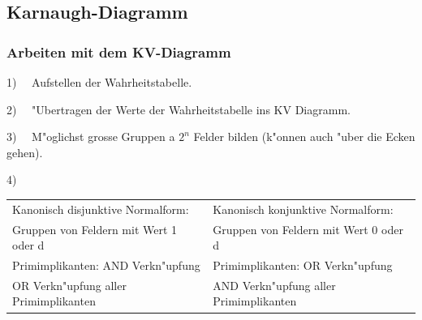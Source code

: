 \subsection{Karnaugh-Diagramm}
	\subsubsection{Arbeiten mit dem KV-Diagramm}
\begin{compactitem}
	\item 1) \ \ Aufstellen der Wahrheitstabelle.\\
	\item 2) \ \ "Ubertragen der Werte der Wahrheitstabelle ins KV Diagramm.\\
	\item 3) \ \ M"oglichst grosse Gruppen a $2^n$ Felder bilden (k"onnen auch "uber die Ecken gehen).\\
	\item 4)
	\begin{tabular}{ll}
		Kanonisch disjunktive Normalform: & Kanonisch konjunktive Normalform: \\
		Gruppen von Feldern mit Wert 1 oder d & Gruppen von Feldern mit Wert 0 oder d\\
		Primimplikanten: AND Verkn"upfung & Primimplikanten: OR Verkn"upfung\\
		OR Verkn"upfung aller Primimplikanten & AND Verkn"upfung aller Primimplikanten\\
	\end{tabular}
\end{compactitem}
\newpage
